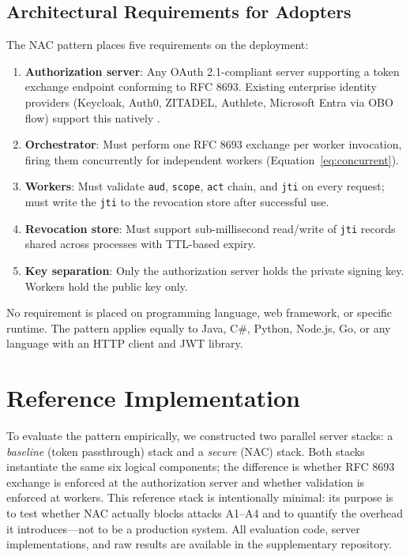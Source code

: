 \documentclass[journal]{IEEEtran}
\begin{document}
\subsection{Architectural Requirements for Adopters}

The NAC pattern places five requirements on the deployment:

\begin{enumerate}
  \item \textbf{Authorization server}: Any OAuth 2.1-compliant server supporting
        a token exchange endpoint conforming to RFC 8693. Existing enterprise
        identity providers (Keycloak, Auth0, ZITADEL, Authlete, Microsoft Entra
        via OBO flow) support this natively \cite{rfc8693_deploy}.
  \item \textbf{Orchestrator}: Must perform one RFC 8693 exchange per worker
        invocation, firing them concurrently for independent workers
        (Equation~\ref{eq:concurrent}).
  \item \textbf{Workers}: Must validate \texttt{aud}, \texttt{scope},
        \texttt{act} chain, and \texttt{jti} on every request; must write the
        \texttt{jti} to the revocation store after successful use.
  \item \textbf{Revocation store}: Must support sub-millisecond read/write of
        \texttt{jti} records shared across processes with TTL-based expiry.
  \item \textbf{Key separation}: Only the authorization server holds the private
        signing key. Workers hold the public key only.
\end{enumerate}

No requirement is placed on programming language, web framework, or specific
runtime. The pattern applies equally to Java, C\#, Python, Node.js, Go, or any
language with an HTTP client and JWT library.


\section{Reference Implementation}
\label{sec:impl}

To evaluate the pattern empirically, we constructed two parallel server stacks:
a \textit{baseline} (token passthrough) stack and a \textit{secure} (NAC) stack.
Both stacks instantiate the same six logical components; the difference is whether
RFC 8693 exchange is enforced at the authorization server and whether validation
is enforced at workers. This reference stack is intentionally minimal: its
purpose is to test whether NAC actually blocks attacks A1--A4 and to quantify
the overhead it introduces---not to be a production system. All evaluation code,
server implementations, and raw results are available in the supplementary
repository.
\end{document}
